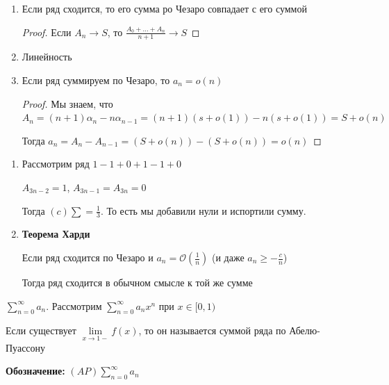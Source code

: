 \begin{properties}
    \begin{enumerate}
        \item {
            Если ряд сходится, то его сумма ро Чезаро совпадает с его суммой

            \begin{proof}
                Если $A_n \rightarrow S$, то $\frac{A_0 + \ldots + A_n}{n + 1} \rightarrow S$
            \end{proof}
        }
        \item {
            Линейность
        }
        \item {
            Если ряд суммируем по Чезаро, то $a_n = o(n)$

            \begin{proof}
                Мы знаем, что $A_n = (n + 1)\alpha_n - n\alpha_{n-1} = (n + 1)(s + o(1)) - n(s + o(1)) = S + o(n)$

                Тогда $a_n = A_n - A_{n - 1} = (S + o(n)) - (S + o(n)) = o(n)$
            \end{proof}
        }
    \end{enumerate}
\end{properties}

\begin{remark}
    \begin{enumerate}
        \item {
            Рассмотрим ряд $1 - 1 + 0 + 1 - 1 + 0$

            $A_{3n - 2} = 1$, $A_{3n - 1} = A_{3n} = 0$

            Тогда $(c) \sum = \frac{1}{3}$. То есть мы добавили нули и испортили сумму.
        }
        \item {
            \textbf{Теорема Харди}

            Если ряд сходится по Чезаро и $a_n = \mathcal{O} \left(\frac{1}{n} \right)$ (и даже $a_n \geqslant -\frac{c}{n}$)

            Тогда ряд сходится в обычном смысле к той же сумме
        }
    \end{enumerate}
\end{remark}

\begin{definition}
    $\sum\limits_{n=0}^\infty a_n$. Рассмотрим $\sum\limits_{n=0}^\infty a_nx^n$ при $x \in [0, 1)$

    Если существует $\lim\limits_{x \to 1-} f(x)$, то он называется суммой ряда по Абелю-Пуассону

    \textbf{Обозначение:} $(AP) \sum\limits_{n=0}^\infty a_n$
\end{definition}

